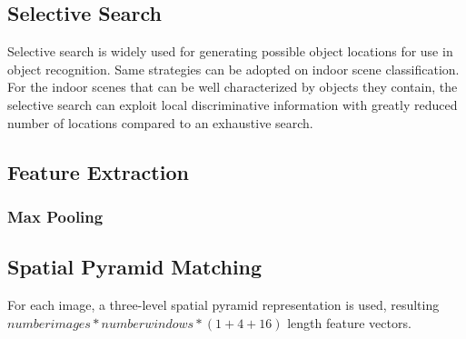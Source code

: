 
\subsection{Selective Search}
Selective search is widely used for generating possible object locations for
use in object recognition\cite{Uijlings:2013:SSO}. Same strategies can be
adopted on indoor scene classification. For the indoor scenes that can be well
characterized by objects they contain, the selective search can exploit local
discriminative information with greatly reduced number of locations compared
to an exhaustive search.

\subsection{Feature Extraction}

\subsubsection{Max Pooling}

\subsection{Spatial Pyramid Matching}
For each image, a three-level spatial pyramid representation is used, resulting
$number images * number windows * (1 + 4 + 16)$ length feature vectors.